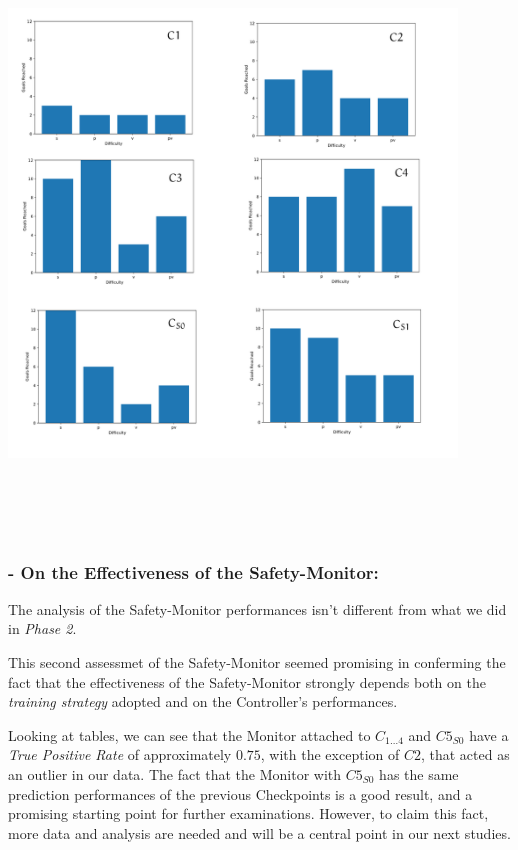 \begin{minipage}[c]{450px}
	\includegraphics[width=450px,height=600px]{img/goals.png}
\end{minipage}


\subsubsection{- On the Effectiveness of the Safety-Monitor:}

The analysis of the Safety-Monitor performances isn't different from what we did in \textsl{Phase 2}.

This second assessmet of the Safety-Monitor seemed promising in conferming the fact that the effectiveness of the Safety-Monitor strongly depends both on the \textsl{training strategy} adopted and on the Controller's performances.

Looking at tables, we can see that the Monitor attached to $C_{1\dots 4}$ and $C5_{S0}$ have a \textsl{True Positive Rate} of approximately $0.75$, with the exception of $C2$, that acted as an outlier in our data. The fact that the Monitor with $C5_{S0}$ has the same prediction performances of the previous Checkpoints is a good result, and a promising starting point for further examinations. However, to claim this fact, more data and analysis are needed and will be a central point in our next studies.\newline

